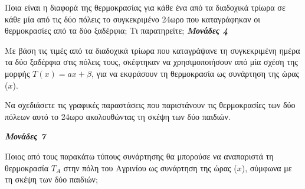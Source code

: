 \documentclass[11pt,a4paper,twoside]{book}
\newcommand{\monades}[1]{
\hspace*{\fill}
\textbf{\textit{\textcolor{maincolor}{Μονάδες #1}}}}
\begin{document}
\begin{alist}
\item Ποια είναι η διαφορά της θερμοκρασίας για κάθε ένα από τα διαδοχικά τρίωρα σε κάθε μία από τις δύο πόλεις το συγκεκριμένο 24ωρο που καταγράφηκαν οι θερμοκρασίες από τα δύο ξαδέρφια; Τι παρατηρείτε;\monades{4}
\item Με βάση τις τιμές από τα διαδοχικά τρίωρα που καταγράψανε τη συγκεκριμένη ημέρα τα δύο ξαδέρφια στις πόλεις τους, σκέφτηκαν να χρησιμοποιήσουν από μία σχέση της μορφής $Τ(x) = ax + \beta$, για να εκφράσουν τη θερμοκρασία ως συνάρτηση της ώρας ($x$).

\begin{rlist}
\item Να σχεδιάσετε τις γραφικές παραστάσεις που παριστάνουν τις θερμοκρασίες των δύο πόλεων αυτό το 24ωρο ακολουθώντας τη σκέψη των δύο παιδιών.
\monades{7}
\item Ποιος από τους παρακάτω τύπους συνάρτησης θα μπορούσε να αναπαριστά τη θερμοκρασία $T_{A}$ στην πόλη του Αγρινίου ως συνάρτηση της ώρας ($x$), σύμφωνα με τη σκέψη των δύο παιδιών;

\end{rlist}
\end{alist}
\end{document}
